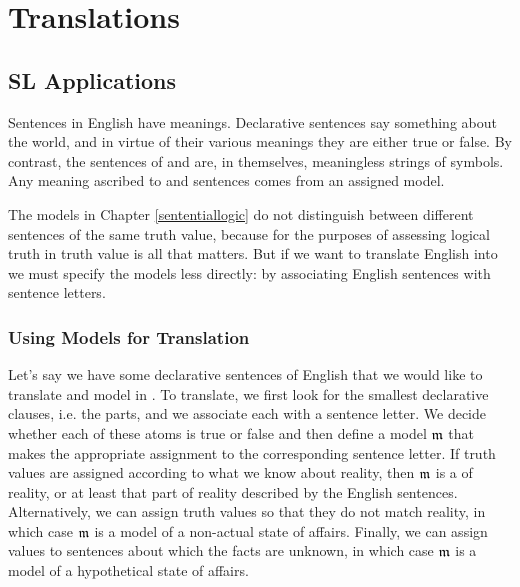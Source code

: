 \chapter{Translations}\label{Translations}

\section{SL Applications}\label{SLApplications}


Sentences in English have meanings.
Declarative sentences say something about the world, and in virtue of their various meanings they are either true or false.
By contrast, the sentences of \GSL{} and \GQL{} are, in themselves, meaningless strings of symbols.
Any meaning ascribed to \GSL{} and \GQL{} sentences comes from an assigned model.

The models in Chapter \ref{sententiallogic} do not distinguish between different sentences of the same truth value, because for the purposes of assessing logical truth in \GSL{} truth value is all that matters.
But if we want to translate English into \GSL{} we must specify the models less directly: by associating English sentences with sentence letters.

\subsection{Using \GSL{} Models for Translation}\label{GSLTranslationModels}

Let's say we have some declarative sentences of English that we would like to translate and model in \GSL{}.
To translate, we first look for the smallest declarative clauses, i.e. the  parts, and we associate each with a sentence letter.
We decide whether each of these atoms is true or false and then define a model $\mathfrak{m}$ that makes the appropriate assignment to the corresponding sentence letter.
If truth values are assigned according to what we know about reality, then $\mathfrak{m}$ is a  of reality, or at least that part of reality described by the English sentences.
Alternatively, we can assign truth values so that they do not match reality, in which case $\mathfrak{m}$ is a model of a non-actual state of affairs.
Finally, we can assign values to sentences about which the facts are unknown, in which case $\mathfrak{m}$ is a model of a hypothetical state of affairs.

